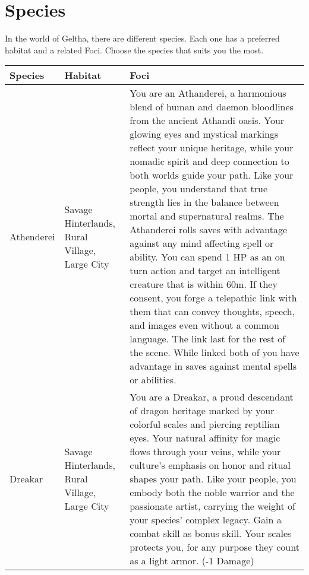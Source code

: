 \documentclass[itdr/core]{subfiles}
\begin{document}
\section{Species} %
\label{sec:species}
In the world of Geltha, there are different species. Each one has a preferred habitat and a related Foci. Choose the species that suits you the most.
\begin{longtable}{p{}p{}p{}}
\hline
\textbf{Species} & \textbf{Habitat} & \textbf{Foci} \\
\hline

Athenderei & Savage Hinterlands, Rural Village, Large City & You are an Athanderei, a harmonious blend of human and daemon bloodlines from the ancient Athandi oasis. Your glowing eyes and mystical markings reflect your unique heritage, while your nomadic spirit and deep connection to both worlds guide your path. Like your people, you understand that true strength lies in the balance between mortal and supernatural realms. The Athanderei rolls saves with advantage against any mind affecting spell or ability. You can spend 1 HP as an on turn action and target an intelligent creature that is within 60m. If they consent, you forge a telepathic link with them that can convey thoughts, speech, and images even without a common language. The link last for the rest of the scene. While linked both of you have advantage in saves against mental spells or abilities. \\

Dreakar & Savage Hinterlands, Rural Village, Large City & You are a Dreakar, a proud descendant of dragon heritage marked by your colorful scales and piercing reptilian eyes. Your natural affinity for magic flows through your veins, while your culture's emphasis on honor and ritual shapes your path. Like your people, you embody both the noble warrior and the passionate artist, carrying the weight of your species' complex legacy. Gain a combat skill as bonus skill. Your scales protects you, for any purpose they count as a light armor. (-1 Damage) \\


\end{longtable}
\end{document}
